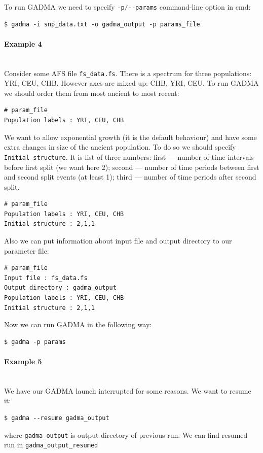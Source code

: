 \documentclass[12pt]{article}
\makeatletter
\newcommand{\py}[1]{\lstinline[language=Python, showstringspaces=False]@#1@}
\makeatother
\begin{document}
To run GADMA we need to specify \py{-p/--params} command-line option in cmd:
\begin{lstlisting}
$ gadma -i snp_data.txt -o gadma_output -p params_file
\end{lstlisting}

\paragraph{Example 4}\mbox{}\\
Consider some AFS file \py{fs_data.fs}. There is a spectrum for three populations: YRI, CEU, CHB. However axes are mixed up: CHB, YRI, CEU. To run GADMA we should order them from most ancient to most recent:
\begin{lstlisting}
# param_file
Population labels : YRI, CEU, CHB
\end{lstlisting}

We want to allow exponential growth (it is the default behaviour) and have some extra changes in size of the ancient population. To do so we should specify \py{Initial structure}. It is list of three numbers: first --- number of time intervals before first split (we want here 2); second --- number of time periods between first and second split events (at least 1); third --- number of time periods after second split.

\begin{lstlisting}
# param_file
Population labels : YRI, CEU, CHB
Initial structure : 2,1,1
\end{lstlisting}

Also we can put information about input file and output directory to our parameter file:
\begin{lstlisting}
# param_file
Input file : fs_data.fs
Output directory : gadma_output
Population labels : YRI, CEU, CHB
Initial structure : 2,1,1
\end{lstlisting}

Now we can run GADMA in the following way:
\begin{lstlisting}
$ gadma -p params
\end{lstlisting}

\paragraph{Example 5}\mbox{}\\
We have our GADMA launch interrupted for some reasons. We want to resume it:
\begin{lstlisting}
$ gadma --resume gadma_output
\end{lstlisting}
where \py{gadma_output} is output directory of previous run. We can find resumed run in \py{gadma_output_resumed}
\end{document}
